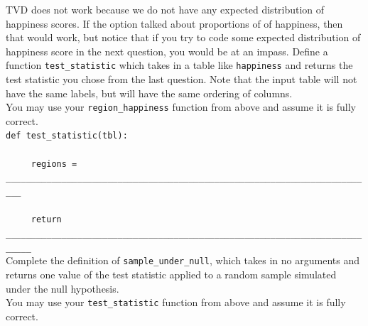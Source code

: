 \begin{enumerate}
{TVD does not work because we do not have any expected distribution of happiness scores. If the option talked about proportions of of happiness, then that would work, but notice that if you try to code some expected distribution of happiness score in the next question, you would be at an impass. }
\vfill
{} Define a function {\tt test\_statistic} which takes in a table like {\tt happiness} and returns the test statistic you chose from the last question. Note that the input table will not have the same labels, but will have the same ordering of columns. 
\\ 
You may use your {\tt region\_happiness} function from above and assume it is fully correct. \\

\lstinline{def test_statistic(tbl):} \\ \\
\lstinline{     regions = _________________________________________________________________________} \\ \\
\lstinline{     return ___________________________________________________________________________} \\
\vfill
{}  Complete the definition of {\tt sample\_under\_null}, which takes in no arguments and returns one value of the test statistic applied to a random sample simulated under the null hypothesis. 
\\
You may use your {\tt test\_statistic} function from above and assume it is fully correct. 
\\


\end{enumerate}
